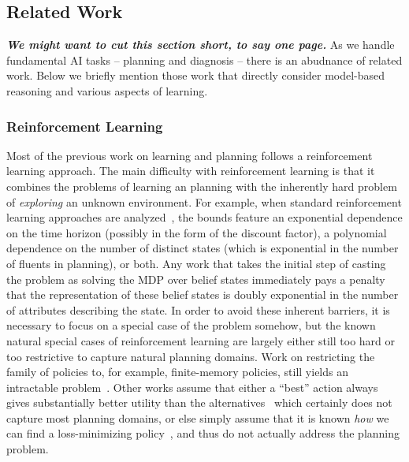 \documentclass[12pt]{article}
\newcommand{\note}[1]{\textbf{\textit{#1}}}
\begin{document}
 



\subsection{Related Work}
\note{We might want to cut this section short, to say one page.}
As we handle fundamental AI tasks -- planning and diagnosis -- there is an abudnance of related work. 
Below we briefly mention those work that directly consider model-based reasoning and various aspects of learning. 


\subsubsection{Reinforcement Learning}
\label{reinforcementLearning}
 Most of the previous work on learning and planning follows a reinforcement learning approach. The main difficulty with reinforcement learning is that it combines the problems of learning an planning with the inherently hard problem of {\em exploring} an unknown environment. For example, when standard reinforcement learning approaches are analyzed~\cite{kearns2002POMDPsample,shani2005modelPOMDP}, the bounds feature an exponential dependence on the time horizon (possibly in the form of the discount factor), a polynomial dependence on the number of distinct states (which is exponential in the number of fluents in planning), or both. Any work that takes the initial step of casting the problem as solving the MDP over belief states immediately pays a penalty that the representation of these belief states is doubly exponential in the number of attributes describing the state.  In order to avoid these inherent barriers, it is necessary to focus on a special case of the problem somehow, but the known natural special cases of reinforcement learning are largely either still too hard or too restrictive to capture natural planning domains. Work on restricting the family of policies to, for example, finite-memory policies, still yields an intractable problem~\cite{meuleau1999finitestate}. Other works assume that either a ``best'' action always gives substantially better utility than the alternatives~\cite{fern2006policyIteration} which certainly does not capture most planning domains, or else simply assume that it is known {\em how} we can find a loss-minimizing policy~\cite{lazaric2010policyIteration}, and thus do not actually address the planning problem.
\end{document}
